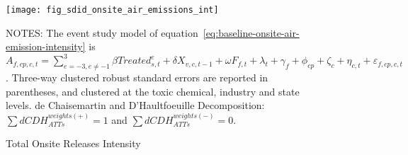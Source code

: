 \begin{figure}[H]
    \centering
    \texttt{[image: fig\_sdid\_onsite\_air\_emissions\_int]}
    \caption{Total Onsite Releases Intensity}
    \label{fig:baseline-onsite-air-emission-intensity}
    \begin{minipage}{18cm}
        \vspace{0.05in}
        NOTES: The event study model of equation~\ref{eq:baseline-onsite-air-emission-intensity} is $A_{f,cp,c,t} = \sum_{{e = -3},{e \neq -1}}^{3} \beta Treated_{s,t}^e + \delta X_{v,c,t-1} + \omega F_{f,t} + \lambda_{t} + \gamma_{f} + \phi_{cp} + \zeta_{c} + \eta_{c,t} + \varepsilon_{f,cp,c,t}$. Three-way clustered robust standard errors are reported in parentheses, and clustered at the toxic chemical, industry and state levels. de Chaisemartin and D'Haultfoeuille Decomposition: $\sum dCDH_{ATTs}^{weights(+)} = 1$ and $\sum dCDH_{ATTs}^{weights(-)} = 0$.
    \end{minipage}
\end{figure}